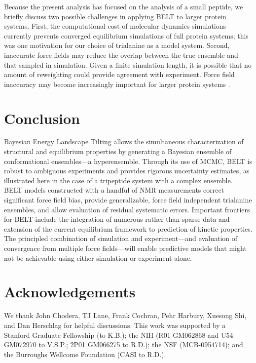 \documentclass[12pt]{article}
\begin{document}
Because the present analysis has focused on the analysis of a small peptide, we briefly discuss two possible challenges in applying BELT to larger protein systems.  First, the computational cost of molecular dynamics simulations currently prevents converged equilibrium simulations of full protein systems; this was one motivation for our choice of trialanine as a model system.  Second, inaccurate force fields may reduce the overlap between the true ensemble and that sampled in simulation.  Given a finite simulation length, it is possible that no amount of reweighting could provide agreement with experiment.  Force field inaccuracy may become increasingly important for larger protein systems \cite{raval2012refinement}.


\section*{Conclusion}

Bayesian Energy Landscape Tilting allows the simultaneous characterization of structural and equilibrium properties by generating a Bayesian ensemble of conformational ensembles---a hyperensemble.  Through its use of MCMC, BELT is robust to ambiguous experiments and provides rigorous uncertainty estimates, as illustrated here in the case of a tripeptide system with a complex ensemble.  BELT models constructed with a handful of NMR measurements correct significant force field bias, provide generalizable, force field independent trialanine ensembles, and allow evaluation of residual systematic errors. Important frontiers for BELT include the integration of numerous rather than sparse data and extension of the current equilibrium framework to prediction of kinetic properties.  The principled combination of simulation and experiment---and evaluation of convergence from multiple force fields---will enable predictive models that might not be achievable using either simulation or experiment alone.  


\section*{Acknowledgements}

We thank John Chodera, TJ Lane, Frank Cochran, Pehr Harbury, Xuesong Shi, and Dan Herschlag for helpful discussions.  This work was supported by a Stanford Graduate Fellowship (to K.B.); the NIH (R01 GM062868 and U54 GM072970 to V.S.P.; 2P01 GM066275 to R.D.); the NSF (MCB-0954714); and the Burroughs Wellcome Foundation (CASI to R.D.).
\end{document}
